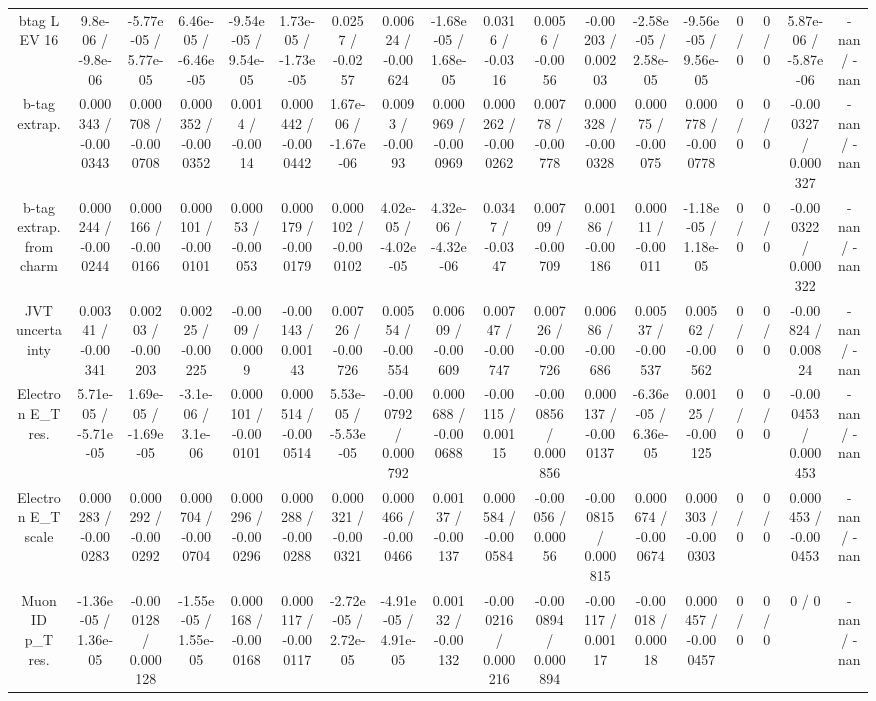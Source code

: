 \documentclass[10pt]{article}
\begin{document}
\begin{table}[htbp]
\begin{center}
\begin{tabular}{|c|c|c|c|c|c|c|c|c|c|c|c|c|c|c|c|c|c|}
  btag L EV 16 & 9.8e-06 / -9.8e-06 & -5.77e-05 / 5.77e-05 & 6.46e-05 / -6.46e-05 & -9.54e-05 / 9.54e-05 & 1.73e-05 / -1.73e-05 & 0.0257 / -0.0257 & 0.00624 / -0.00624 & -1.68e-05 / 1.68e-05 & 0.0316 / -0.0316 & 0.0056 / -0.0056 & -0.00203 / 0.00203 & -2.58e-05 / 2.58e-05 & -9.56e-05 / 9.56e-05 & 0 / 0 & 0 / 0 & 5.87e-06 / -5.87e-06 & -nan / -nan \\ 
  b-tag extrap. & 0.000343 / -0.000343 & 0.000708 / -0.000708 & 0.000352 / -0.000352 & 0.0014 / -0.0014 & 0.000442 / -0.000442 & 1.67e-06 / -1.67e-06 & 0.0093 / -0.0093 & 0.000969 / -0.000969 & 0.000262 / -0.000262 & 0.00778 / -0.00778 & 0.000328 / -0.000328 & 0.00075 / -0.00075 & 0.000778 / -0.000778 & 0 / 0 & 0 / 0 & -0.000327 / 0.000327 & -nan / -nan \\ 
  b-tag extrap. from charm & 0.000244 / -0.000244 & 0.000166 / -0.000166 & 0.000101 / -0.000101 & 0.00053 / -0.00053 & 0.000179 / -0.000179 & 0.000102 / -0.000102 & 4.02e-05 / -4.02e-05 & 4.32e-06 / -4.32e-06 & 0.0347 / -0.0347 & 0.00709 / -0.00709 & 0.00186 / -0.00186 & 0.00011 / -0.00011 & -1.18e-05 / 1.18e-05 & 0 / 0 & 0 / 0 & -0.000322 / 0.000322 & -nan / -nan \\ 
  JVT uncertainty & 0.00341 / -0.00341 & 0.00203 / -0.00203 & 0.00225 / -0.00225 & -0.0009 / 0.0009 & -0.00143 / 0.00143 & 0.00726 / -0.00726 & 0.00554 / -0.00554 & 0.00609 / -0.00609 & 0.00747 / -0.00747 & 0.00726 / -0.00726 & 0.00686 / -0.00686 & 0.00537 / -0.00537 & 0.00562 / -0.00562 & 0 / 0 & 0 / 0 & -0.00824 / 0.00824 & -nan / -nan \\ 
  Electron E_{T} res. & 5.71e-05 / -5.71e-05 & 1.69e-05 / -1.69e-05 & -3.1e-06 / 3.1e-06 & 0.000101 / -0.000101 & 0.000514 / -0.000514 & 5.53e-05 / -5.53e-05 & -0.000792 / 0.000792 & 0.000688 / -0.000688 & -0.00115 / 0.00115 & -0.000856 / 0.000856 & 0.000137 / -0.000137 & -6.36e-05 / 6.36e-05 & 0.00125 / -0.00125 & 0 / 0 & 0 / 0 & -0.000453 / 0.000453 & -nan / -nan \\ 
  Electron E_{T} scale & 0.000283 / -0.000283 & 0.000292 / -0.000292 & 0.000704 / -0.000704 & 0.000296 / -0.000296 & 0.000288 / -0.000288 & 0.000321 / -0.000321 & 0.000466 / -0.000466 & 0.00137 / -0.00137 & 0.000584 / -0.000584 & -0.00056 / 0.00056 & -0.000815 / 0.000815 & 0.000674 / -0.000674 & 0.000303 / -0.000303 & 0 / 0 & 0 / 0 & 0.000453 / -0.000453 & -nan / -nan \\ 
  Muon ID p_{T} res. & -1.36e-05 / 1.36e-05 & -0.000128 / 0.000128 & -1.55e-05 / 1.55e-05 & 0.000168 / -0.000168 & 0.000117 / -0.000117 & -2.72e-05 / 2.72e-05 & -4.91e-05 / 4.91e-05 & 0.00132 / -0.00132 & -0.000216 / 0.000216 & -0.000894 / 0.000894 & -0.00117 / 0.00117 & -0.00018 / 0.00018 & 0.000457 / -0.000457 & 0 / 0 & 0 / 0 & 0 / 0 & -nan / -nan \\ 

\end{tabular}
\end{center}
\end{table}
\end{document}
